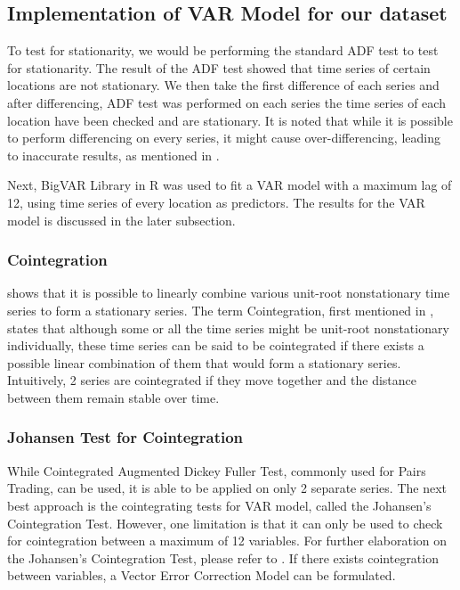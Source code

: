 \documentclass[12pt, letterpaper] {article}
\begin{document}
\subsection{Implementation of VAR Model for our dataset}

To test for stationarity, we would be performing the standard ADF test to test for stationarity. The result of the ADF test showed that time series of certain locations are not stationary. We then take the first difference of each series and after differencing, ADF test was performed on each series the time series of each location have been checked and are stationary. It is noted that while it is possible to perform differencing on every series, it might cause over-differencing, leading to inaccurate results, as mentioned in \cite{Ruey2014}.

\noindent Next, BigVAR Library in R was used to fit a VAR model with a maximum lag of 12, using time series of every location as predictors. The results for the VAR model is discussed in the later subsection. 


\subsubsection{Cointegration}
\cite{Box1977} shows that it is possible to linearly combine various unit-root nonstationary time series to form a stationary series. The term Cointegration, first mentioned in \cite{Granger1983}, states that although some or all the time series might be unit-root nonstationary individually, these time series can be said to be cointegrated if there exists a possible linear combination of them that would form a stationary series. Intuitively, 2 series are cointegrated if they move together and the distance between them remain stable over time. 

\subsubsection{Johansen Test for Cointegration}
While Cointegrated Augmented Dickey Fuller Test, commonly used for Pairs Trading, can be used, it is able to be applied on only 2 separate series. The next best approach is the cointegrating tests for VAR model, called the Johansen's Cointegration Test. However, one limitation is that it can only be used to check for cointegration between a maximum of 12 variables. For further elaboration on the Johansen's Cointegration Test, please refer to \cite{Johansen1991}. If there exists cointegration between variables, a Vector Error Correction Model can be formulated. 
\end{document}
